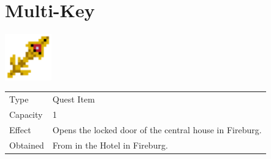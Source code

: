 \section{Multi-Key}
\label{item:multi_key}

\includegraphics[height=2cm,keepaspectratio]{./resources/items/multikey}

\begin{longtable}{ l p{9cm} }
	Type
	& Quest Item
\\ %
	Capacity
	& 1
\\ %
	Effect
	& Opens the locked door of the central house in Fireburg.
\\ %
	Obtained
	& From \nameref{char:tristam} in the Hotel in Fireburg.
\end{longtable}
